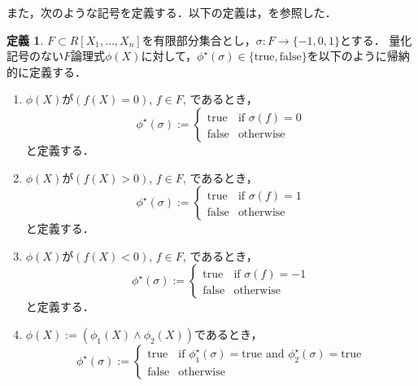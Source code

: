 \documentclass[uplatex, dvipdfmx]{jsarticle}
\numberwithin{equation}{section}
\newcommand{\map}[3]{{#1}\colon{#2}\rightarrow{#3}}
\newcommand{\true}{\text{true}}
\newcommand{\false}{\text{false}}
\theoremstyle{definition}
\newtheorem{definition}{定義}[section]
\begin{document}
また，次のような記号を定義する．以下の定義は，\cite[Notation 11.12.]{MR2248869}を参照した．
\begin{definition}
     $F \subset R[X_1, \dots, X_n]$を有限部分集合とし，$\map{\sigma}{F}{\{-1, 0, 1\}}$とする．
     量化記号のない$F$論理式$\phi(X)$に対して，$\phi^\star(\sigma) \in \{\true, \false\}$を以下のように帰納的に定義する．
     \begin{enumerate}
          \item $\phi(X)$が$(f(X)=0)$, $f \in F$, であるとき，
          \begin{equation}
               \phi^\star(\sigma):= \begin{cases}
                    \true  & \text{if $\sigma(f)=0$}\\
                    \false & \text{otherwise}
               \end{cases}
          \end{equation}
          と定義する．
          \item $\phi(X)$が$(f(X)>0)$, $f \in F$, であるとき，
          \begin{equation}
               \phi^\star(\sigma):= \begin{cases}
                    \true  & \text{if $\sigma(f)=1$}\\
                    \false & \text{otherwise}
               \end{cases}
          \end{equation}
          と定義する．
          \item $\phi(X)$が$(f(X)<0)$, $f \in F$, であるとき，
          \begin{equation}
               \phi^\star(\sigma):= \begin{cases}
                    \true  & \text{if $\sigma(f)=-1$}\\
                    \false & \text{otherwise}
               \end{cases}
          \end{equation}
          と定義する．
          \item $\phi(X):=(\phi_1(X) \land \phi_2(X))$であるとき，
          \begin{equation}
               \phi^\star(\sigma):= \begin{cases}
                    \true  & \text{if $\phi_1^\star(\sigma)=\true$ and $\phi_2^\star(\sigma)=\true$}\\
                    \false & \text{otherwise}
               \end{cases}

\end{equation}
\end{enumerate}
\end{definition}
\end{document}
